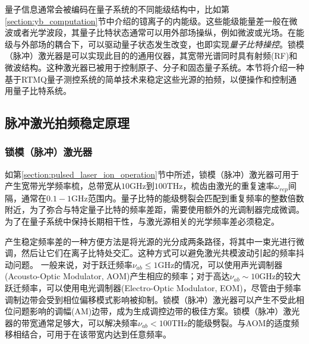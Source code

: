 量子信息通常会被编码在量子系统的不同能级结构中，比如第\ref{section:yb_computation}节中介绍的镱离子的内能级。这些能级能量差一般在微波或者光学波段，其量子比特状态通常可以用外部场操纵，例如微波或光场。在能级与外部场的耦合下，可以驱动量子状态发生改变，也即实现\emph{量子比特操控}。锁模（脉冲）激光器是可以实现此目的的通用仪器，其宽带光谱同时具有射频(RF)和微波结构。这种激光器已被用于控制原子\cite[]{Hayes_Matsukevich_Maunz_Hucul_Quraishi_Olmschenk_Campbell_Mizrahi_Senko_Monroe_2010}、分子\cite[]{Peer_Shapiro_Stowe_Shapiro_Ye_2007}和固态量子系统\cite[]{Greve_Press_McMahon_Yamamoto_2013}。本节将介绍一种基于RTMQ量子测控系统的简单技术来稳定这些光源的拍频，以便操作和控制通用量子比特系统\cite[]{ladd2010quantum}。

\subsection[脉冲激光拍频稳定原理]{脉冲激光拍频稳定原理}





\subsubsection[锁模（脉冲）激光器]{锁模（脉冲）激光器}
如第\ref{section:pulsed_laser_ion_operation}节中所述，锁模（脉冲）激光器可用于产生宽带光学频率梳，总带宽从$10$GHz到$100 $THz，梳齿由激光的重复速率$\omega_{rep}$间隔，通常在$0.1-1 $GHz范围内。量子比特的能级劈裂会匹配到重复频率的整数倍数附近，为了弥合与特定量子比特的频率差距，需要使用额外的光调制器完成微调\cite[]{Hayes_Matsukevich_Maunz_Hucul_Quraishi_Olmschenk_Campbell_Mizrahi_Senko_Monroe_2010}。为了在量子系统中保持长期相干性，与激光源相关的光学频率差必须稳定\cite[]{Stick_Hensinger_Olmschenk_Madsen_Schwab_Monroe_2006}。

产生稳定频率差的一种方便方法是将光源的光分成两条路径，将其中一束光进行微调，然后让它们在离子比特处交汇。这种方式可以避免激光共模波动引起的频率抖动问题\cite[]{Thomas_Hemmer_Ezekiel_Leiby_Picard_Willis_2002}。
一般来说，对于跃迁频率$\nu_{ab}\leq 1$GHz的情况，可以使用声光调制器(Acousto-Optic Modulator, AOM)产生相应的频率；对于高达$\nu_{ab} \sim 10 $GHz的较大跃迁频率，可以使用电光调制器(Electro-Optic Modulator, EOM)，尽管由于频率调制边带会受到相位偏移模式影响被抑制\cite[]{Lee_Blinov_Brickman_Deslauriers_Madsen_Miller_Moehring_Stick_Monroe_2003}。锁模（脉冲）激光器可以产生不受此相位问题影响的调幅(AM)边带，成为生成调控边带的极佳方案。锁模（脉冲）激光器的带宽通常足够大，可以解决频率$\nu_{ab} < 100 $THz的能级劈裂。与AOM的适度频移相结合，可用于在该带宽内达到任意频率。


